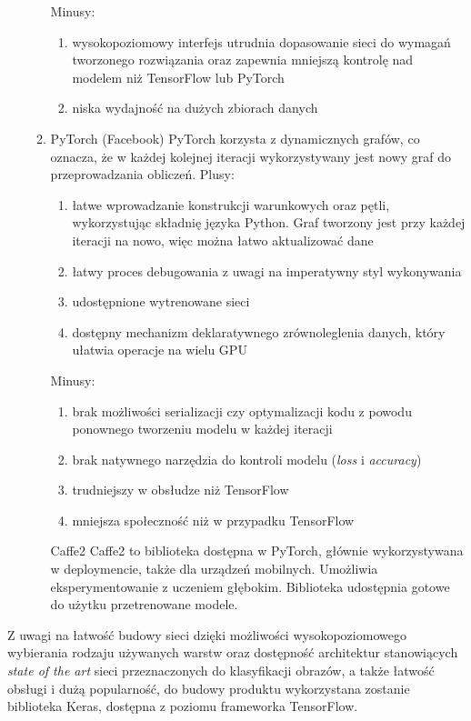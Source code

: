 \documentclass[polish,12pt]{aghthesis}
\begin{document}
\begin{enumerate}
\begin{enumerate}
\begin{enumerate}
        \end{enumerate}
        Minusy:
        \begin{enumerate}
            \item wysokopoziomowy interfejs utrudnia dopasowanie sieci do wymagań tworzonego rozwiązania oraz zapewnia mniejszą kontrolę nad modelem niż TensorFlow lub PyTorch
            \item niska wydajność na dużych zbiorach danych
        \end{enumerate}
        \item PyTorch (Facebook)
        \newline PyTorch korzysta z dynamicznych grafów, co oznacza, że w każdej kolejnej iteracji wykorzystywany jest nowy graf do przeprowadzania obliczeń.
        \newline Plusy:
        \begin{enumerate}
            \item łatwe wprowadzanie konstrukcji warunkowych oraz pętli, wykorzystując składnię języka Python. Graf tworzony jest przy każdej iteracji na nowo, więc można łatwo aktualizować dane
            \item łatwy proces debugowania z uwagi na imperatywny styl wykonywania
            \item udostępnione wytrenowane sieci
            \item dostępny mechanizm deklaratywnego zrównoleglenia danych, który ułatwia operacje na wielu GPU
        \end{enumerate}
        \clearpage
        Minusy:
        \begin{enumerate}
            \item brak możliwości serializacji czy optymalizacji kodu z powodu ponownego tworzeniu modelu w każdej iteracji
            \item brak natywnego narzędzia do kontroli modelu (\textit{loss} i \textit{accuracy})
            \item trudniejszy w obsłudze niż TensorFlow
            \item mniejsza społeczność niż w przypadku TensorFlow
        \end{enumerate}
        Caffe2
        \newline Caffe2 to biblioteka dostępna w PyTorch, głównie wykorzystywana w deploymencie, także dla urządzeń mobilnych. Umożliwia eksperymentowanie z uczeniem głębokim. Biblioteka udostępnia gotowe do użytku przetrenowane modele.
    \end{enumerate}
\end{enumerate}
\par Z uwagi na łatwość budowy sieci dzięki możliwości wysokopoziomowego wybierania rodzaju używanych warstw oraz dostępność architektur stanowiących \textit{state of the art} sieci przeznaczonych do klasyfikacji obrazów, a także łatwość obsługi i dużą popularność, do budowy produktu wykorzystana zostanie biblioteka Keras, dostępna z poziomu frameworka TensorFlow.
\end{document}
